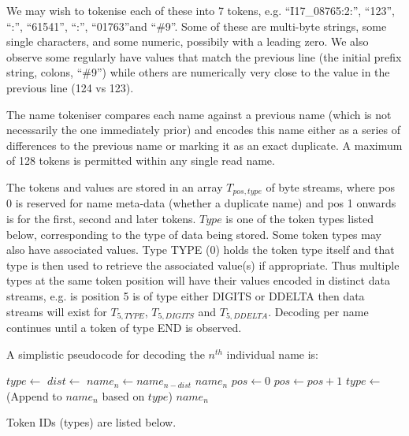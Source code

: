 \documentclass[a4paper]{article}
\begin{document}
We may wish to tokenise each of these into 7 tokens, e.g.
``I17\_08765:2:'', ``123'', ``:'', ``61541'', ``:'', ``01763''and
``\#9''. Some of these are multi-byte strings, some single characters,
and some numeric, possibily with a leading zero.  We also observe some
regularly have values that match the previous line (the initial prefix
string, colons, ``\#9'') while others are numerically very close to the
value in the previous line (124 vs 123).

The name tokeniser compares each name against a previous name (which
is not necessarily the one immediately prior) and encodes this name
either as a series of differences to the previous name or marking it
as an exact duplicate.  A maximum of 128 tokens is permitted within
any single read name.

The tokens and values are stored in an array $T_{pos,type}$ of byte
streams, where pos 0 is reserved for name meta-data (whether a
duplicate name) and pos 1 onwards is for the first, second and later
tokens.  $Type$ is one of the token types listed below, corresponding
to the type of data being stored.  Some token types may also have
associated values.  Type TYPE (0) holds the token type itself and that
type is then used to retrieve the associated value(s) if appropriate.
Thus multiple types at the same token position will have their values
encoded in distinct data streams, e.g. is position 5 is of type either
DIGITS or DDELTA then data streams will exist for $T_{5,TYPE}$,
$T_{5,DIGITS}$ and $T_{5, DDELTA}$.  Decoding per name continues until
a token of type END is observed.

A simplistic pseudocode for decoding the $n^{th}$ individual name is:

\begin{algorithmic}[1]
  \State $type \gets$ 
  \State $dist \gets$ 
    \State $name_n \gets name_{n-dist}$
    \State \Return $name_n$
  \EndIf
  \Statex
  \State $pos \gets 0$
  \Repeat
    \State $pos \gets pos+1$
    \State $type \gets$ 
    \State (Append to $name_n$ based on $type$)
  \State \Return $name_n$
  \EndFunction
\end{algorithmic}


Token IDs (types) are listed below.
\end{document}
